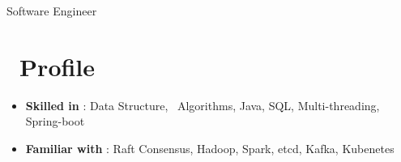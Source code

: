 \documentclass{resume}
\begin{document}

\centerline{Software Engineer}
\vspace{2ex}

\section{\faCogs\ Profile}
\begin{itemize}[parsep=0.5ex]
  \item \textbf{Skilled in} : Data Structure,  Algorithms, Java, SQL, Multi-threading, Spring-boot
  \item \textbf{Familiar with} : Raft Consensus, Hadoop, Spark, etcd, Kafka, Kubenetes
\end{itemize}
\end{document}

